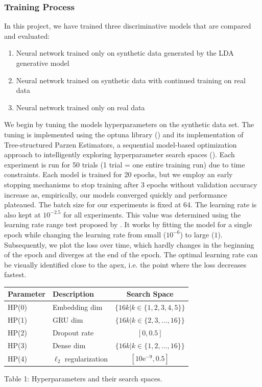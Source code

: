 \documentclass[11pt]{article}
\begin{document}
\subsubsection{Training Process}
In this project, we have trained three discriminative models that are compared and evaluated:
\begin{enumerate}
\itemsep0pt
  \item Neural network trained only on synthetic data generated by the LDA generative model
  \item Neural network trained on synthetic data with continued training on real data
  \item Neural network trained only on real data
\end{enumerate}

\noindent We begin by tuning the models hyperparameters on the synthetic data set. The tuning is implemented using the optuna library (\cite{optunapaper}) and its implementation of Tree-structured Parzen Estimators, a sequential model-based optimization approach to intelligently exploring hyperparameter search spaces (\cite{bergstraTPE}). Each experiment is run for 50 trials (1 trial = one entire training run) due to time constraints. Each model is trained for 20 epochs, but we employ an early stopping mechanisms to stop training after 3 epochs without validation accuracy increase as, empirically, our models converged quickly and performance plateaued. The batch size for our experiments is fixed at 64. The learning rate is also kept at $10^{-2.5}$ for all experiments. This value was determined using the learning rate range test proposed by \cite{smith2018disciplined}. It works by fitting the model for a single epoch while changing the learning rate from small ($10^{-6}$) to large ($1$). Subsequently, we plot the loss over time, which hardly changes in the beginning of the epoch and diverges at the end of the epoch. The optimal learning rate can be visually identified close to the apex, i.e. the point where the loss decreases fastest.

\begin{center}
\begin{tabular}{llc}
\toprule
    Parameter & Description & Search Space \\
\midrule
    HP(0) & Embedding dim & $\{16k \vert k\in \{1, 2, 3, 4, 5\}\}$\\
    HP(1) & GRU dim & $\{16k \vert k \in \{2, 3, ..., 16\}\}$\\
    HP(2) & Dropout rate & $[0, 0.5]$\\
    HP(3) & Dense dim &  $\{16k \vert k \in \{1, 2, ..., 16\}\}$\\
    HP(4) & $\ell_2$ regularization & $[10\mathrm{e}^{-9}, 0.5]$ \\
\bottomrule
\end{tabular}
\end{center}
\begin{center}
	Table 1: Hyperparameters and their search spaces.
\end{center}
\end{document}
